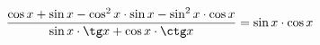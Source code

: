 \begin{ex}[type=prove_identity]
	\begin{condition}
		\( \dfrac{\cos x + \sin x - \cos^2x\cdot\sin x - \sin^2x\cdot\cos x}{\sin x\cdot\tg x+\cos x\cdot\ctg x}=\sin x \cdot \cos x \)
	\end{condition}
\end{ex}